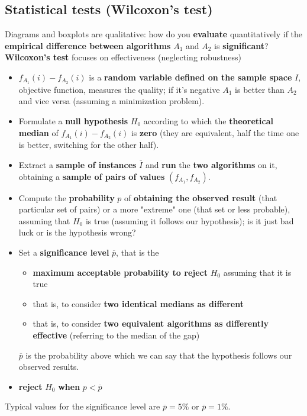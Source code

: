 \newpage

\subsection{Statistical tests (Wilcoxon's test)}
Diagrams and boxplots are qualitative: how do you \textbf{evaluate} quantitatively if the \textbf{empirical difference between algorithms} $A_1$ and $A_2$ is \textbf{significant}?\\

\textbf{Wilcoxon's test} focuses on effectiveness (neglecting robustness)
\begin{itemize}
	\item $f_{A_1} (i) - f_{A_2} (i)$ is a \textbf{random variable defined on the sample space} $I$, objective function, measures the quality; if it's negative $A_1$ is better than $A_2$ and vice versa (assuming a minimization problem).\\
	
	\item Formulate a \textbf{null hypothesis} $H_0$ according to which the \textbf{theoretical median} of $f_{A_1} (i) - f_{A_2} (i)$ is \textbf{zero} (they are equivalent, half the time one is better, switching for the other half).\\
	
	\item Extract a \textbf{sample of instances} $\overline{I}$ and \textbf{run} the \textbf{two algorithms} on it, obtaining a \textbf{sample of pairs of values} $(f_{A_1}, f_{A_2})$.\\
	
	\item Compute the \textbf{probability} $p$ of \textbf{obtaining the observed result} (that particular set of pairs) or a more "extreme" one (that set or less probable), assuming that $H_0$ is true (assuming it follows our hypothesis); is it just bad luck or is the hypothesis wrong? \\
	
	\item Set a \textbf{significance level} $\overline{p}$, that is the
	\begin{itemize}
		\item \textbf{maximum acceptable probability to reject} $H_0$ assuming that it is true
		\item that is, to consider \textbf{two identical medians as different}
		\item that is, to consider \textbf{two equivalent algorithms as differently effective} (referring to the median of the gap)
	\end{itemize}
	$\overline{p}$ is the probability above which we can say that the hypothesis follows our observed results.\\
	
	\item \textbf{reject} $H_0$ \textbf{when} $p < \overline{p}$
\end{itemize}
Typical values for the significance level are $\overline{p} = 5\%$ or $\overline{p} = 1\%$.\\

